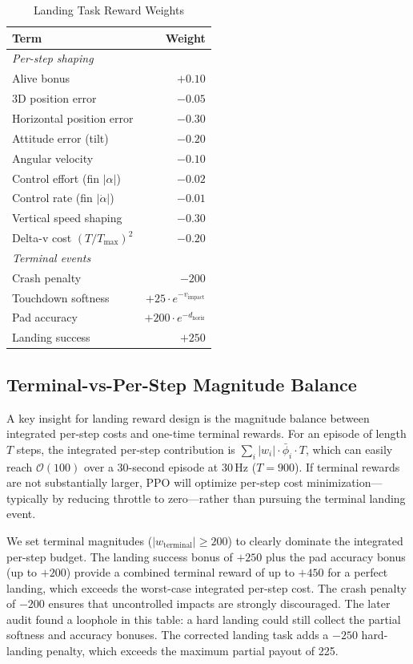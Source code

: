 \documentclass[conference]{IEEEtran}
\begin{document}
\begin{table}[htbp]
\caption{Landing Task Reward Weights}
\label{tab:reward_weights}
\centering
\begin{tabular}{lr}
\toprule
\textbf{Term} & \textbf{Weight} \\
\midrule
\multicolumn{2}{l}{\textit{Per-step shaping}} \\
Alive bonus & $+0.10$ \\
3D position error & $-0.05$ \\
Horizontal position error & $-0.30$ \\
Attitude error (tilt) & $-0.20$ \\
Angular velocity & $-0.10$ \\
Control effort (fin $|\alpha|$) & $-0.02$ \\
Control rate (fin $|\dot{\alpha}|$) & $-0.01$ \\
Vertical speed shaping & $-0.30$ \\
Delta-v cost $(T/T_{\max})^2$ & $-0.20$ \\
\midrule
\multicolumn{2}{l}{\textit{Terminal events}} \\
Crash penalty & $-200$ \\
Touchdown softness & $+25 \cdot e^{-v_{\text{impact}}}$ \\
Pad accuracy & $+200 \cdot e^{-d_{\text{horiz}}}$ \\
Landing success & $+250$ \\
\bottomrule
\end{tabular}
\end{table}

\subsection{Terminal-vs-Per-Step Magnitude Balance}

A key insight for landing reward design is the magnitude balance between integrated per-step costs and one-time terminal rewards. For an episode of length $T$ steps, the integrated per-step contribution is $\sum_i |w_i| \cdot \bar{\phi}_i \cdot T$, which can easily reach $\mathcal{O}(100)$ over a 30-second episode at 30\,Hz ($T = 900$). If terminal rewards are not substantially larger, PPO will optimize per-step cost minimization---typically by reducing throttle to zero---rather than pursuing the terminal landing event.

We set terminal magnitudes ($|w_{\text{terminal}}| \geq 200$) to clearly dominate the integrated per-step budget. The landing success bonus of $+250$ plus the pad accuracy bonus (up to $+200$) provide a combined terminal reward of up to $+450$ for a perfect landing, which exceeds the worst-case integrated per-step cost. The crash penalty of $-200$ ensures that uncontrolled impacts are strongly discouraged. The later audit found a loophole in this table: a hard landing could still collect the partial softness and accuracy bonuses. The corrected landing task adds a $-250$ hard-landing penalty, which exceeds the maximum partial payout of 225.
\end{document}

